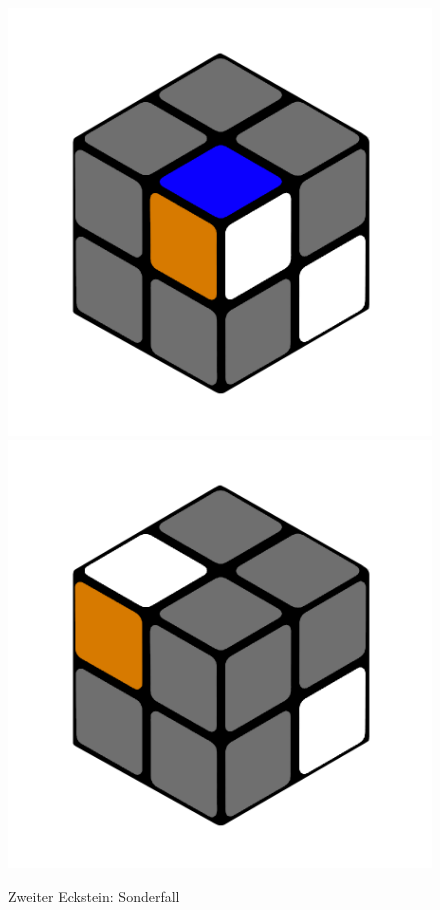 \documentclass[12pt,a4paper, usenames, dvipsnames]{article}
\theoremstyle{mystyle}
\theoremstyle{definition}
\begin{document}
\begin{figure}[H]
\includegraphics[scale=0.1]{e1_s2_s3_s.png}
\includegraphics[scale=0.1]{e1_s2_s4_s.png}
\caption{Zweiter Eckstein: Sonderfall}
\label{Abbildung_ZweiterEckstein2}
\end{figure}
\end{document}
